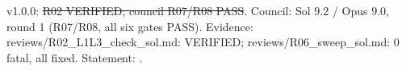 \begin{statusbox}
 v1.0.0: \st{R02 VERIFIED; council R07/R08 PASS}. Council: Sol 9.2 / Opus 9.0, round 1 (R07/R08, all six gates PASS). Evidence: reviews/R02\_L1L3\_check\_sol.md: VERIFIED; reviews/R06\_sweep\_sol.md: 0 fatal, all fixed. Statement: .
\end{statusbox}
